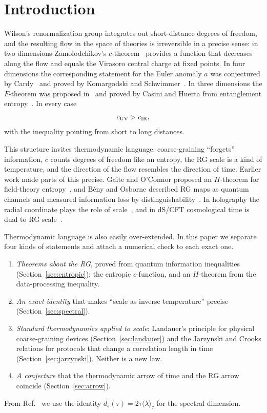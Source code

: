 \documentclass[11pt]{article}
\theoremstyle{remark}\newtheorem*{remark}{Remark}
\begin{document}
\tableofcontents

\section{Introduction}
\label{sec:intro}

Wilson's renormalization group integrates out short-distance degrees of freedom, and the resulting flow
in the space of theories is irreversible in a precise sense: in two dimensions Zamolodchikov's
$c$-theorem~\cite{Zamolodchikov} provides a function that decreases along the flow and equals the Virasoro central
charge at fixed points. In four dimensions the corresponding statement for the Euler anomaly $a$ was conjectured by
Cardy~\cite{Cardy} and proved by Komargodski and Schwimmer~\cite{KS}. In three dimensions the $F$-theorem was proposed
in~\cite{JKPS} and proved by Casini and Huerta from entanglement entropy~\cite{CH2012}. In every case
\begin{equation}
c_{\rm UV}>c_{\rm IR},
\label{eq:cUVIR}
\end{equation}
with the inequality pointing from short to long distances.

This structure invites thermodynamic language: coarse-graining ``forgets'' information, $c$ counts degrees of
freedom like an entropy, the RG scale is a kind of temperature, and the direction of the flow resembles the
direction of time. Earlier work made parts of this precise. Gaite and O'Connor proposed an $H$-theorem for
field-theory entropy~\cite{GaiteOConnor}, and Bény and Osborne described RG maps as quantum channels and measured
information loss by distinguishability~\cite{BenyOsborne}. In holography the radial coordinate plays the role of
scale~\cite{FGPW,MyersSinha}, and in dS/CFT cosmological time is dual to RG scale~\cite{StromingerdS,StromingerInfl}.

Thermodynamic language is also easily over-extended. In this paper we separate four kinds of statements and
attach a numerical check to each exact one.
\begin{enumerate}
\item \emph{Theorems about the RG}, proved from quantum information inequalities (Section~\ref{sec:entropic}): the
entropic $c$-function, and an $H$-theorem from the data-processing inequality.
\item \emph{An exact identity} that makes ``scale as inverse temperature'' precise (Section~\ref{sec:spectral}).
\item \emph{Standard thermodynamics applied to scale}: Landauer's principle for physical coarse-graining devices
(Section~\ref{sec:landauer}) and the Jarzynski and Crooks relations for protocols that change a correlation
length in time (Section~\ref{sec:jarzynski}). Neither is a new law.
\item \emph{A conjecture} that the thermodynamic arrow of time and the RG arrow coincide
(Section~\ref{sec:arrow}).
\end{enumerate}
From Ref.~\cite{Chen2026_qgc} we use the identity $d_s(\tau)=2\tau\langle\lambda\rangle_\tau$ for the spectral dimension.
\end{document}
